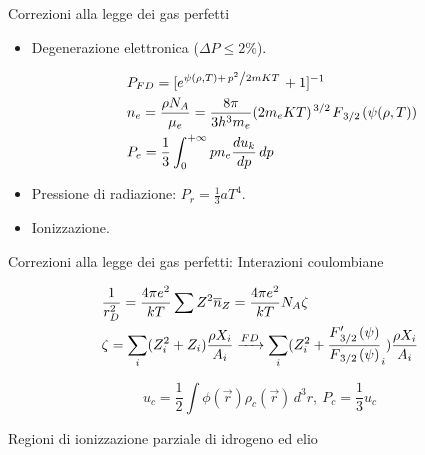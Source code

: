 \begin{frame}{Correzioni alla legge dei gas perfetti}

\begin{itemize}
\item Degenerazione elettronica ($\Delta P\leq2\%$).

\begin{align}
&P_{FD}=[\exp{\psi(\rho,T)+\midfrac{p^2}{2mKT}}+1]\expy{-1}\\
&n_e=\frac{\rho N_A}{\mu_e}=\frac{8\pi}{3h^3m_e}(2m_eKT)\expy{\midfrac{3}{2}}F_{\midfrac{3}{2}}(\psi(\rho,T))\\
&P_e=\frac{1}{3}\intzi{}pn_e\TDy{p}{u_k}\,dp
\end{align}

\item Pressione di radiazione: $P_r=\frac{1}{3}aT^4$.

\item Ionizzazione.

\end{itemize}

\end{frame}

\begin{frame}{Correzioni alla legge dei gas perfetti: Interazioni coulombiane}

\begin{align}
&\frac{1}{r_D^2}=\frac{4\pi e^2}{kT}\sum Z^2\overline{n}_Z=\frac{4\pi e^2}{kT}N_A\zeta\\
&\zeta=\sum_{i}(Z_i^2+Z_i)\frac{\rho X_i}{A_i}\xrightarrow{FD}\sum_{i}(Z_i^2+\frac{F_{\midfrac{3}{2}}'(\psi)}{F_{\midfrac{3}{2}}(\psi)}_i)\frac{\rho X_i}{A_i}
\end{align}

\begin{equation}
u_c=\frac{1}{2}\int\phi(\vec{r})\rho_c(\vec{r})\,d^3r,\ P_c=\frac{1}{3}u_c
\end{equation}

Regioni di ionizzazione parziale di idrogeno ed elio

\end{frame}

